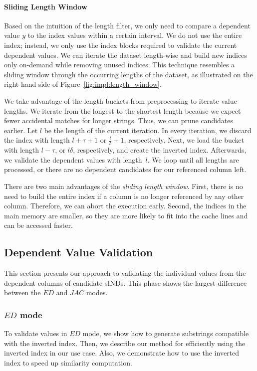\paragraph{Sliding Length Window}
\label{subsection:sind:optimizations:length}
Based on the intuition of the length filter, we only need to compare a dependent value $y$ to the index values within a certain interval.
We do not use the entire index; instead, we only use the index blocks required to validate the current dependent values.
We can iterate the dataset length-wise and build new indices only on-demand while removing unused indices.
This technique resembles a sliding window through the occurring lengths of the dataset, as illustrated on the right-hand side of Figure~\ref{fig:impl:length_window}.

We take advantage of the length buckets from preprocessing to iterate value lengths.
We iterate from the longest to the shortest length because we expect fewer accidental matches for longer strings.
Thus, we can prune candidates earlier.
Let $l$ be the length of the current iteration.
In every iteration, we discard the index with length $l + \tau + 1$ or $\frac{l}{\delta} + 1$, respectively.
Next, we load the bucket with length $l - \tau$, or $l \delta$, respectively, and create the inverted index.
Afterwards, we validate the dependent values with length~$l$.
We loop until all lengths are processed, or there are no dependent candidates for our referenced column left.

There are two main advantages of the \emph{sliding length window}.
First, there is no need to build the entire index if a column is no longer referenced by any other column.
Therefore, we can abort the execution early.
Second, the indices in the main memory are smaller, so they are more likely to fit into the cache lines and can be accessed faster.

\subsection{Dependent Value Validation}
This section presents our approach to validating the individual values from the dependent columns of candidate sINDs.
This phase shows the largest difference between the $ED$ and $JAC$ modes.

\subsubsection{$ED$ mode}
To validate values in $ED$ mode, we show how to generate substrings compatible with the inverted index. Then, we describe our method for efficiently using the inverted index in our use case. Also, we demonstrate how to use the inverted index to speed up similarity computation. 

